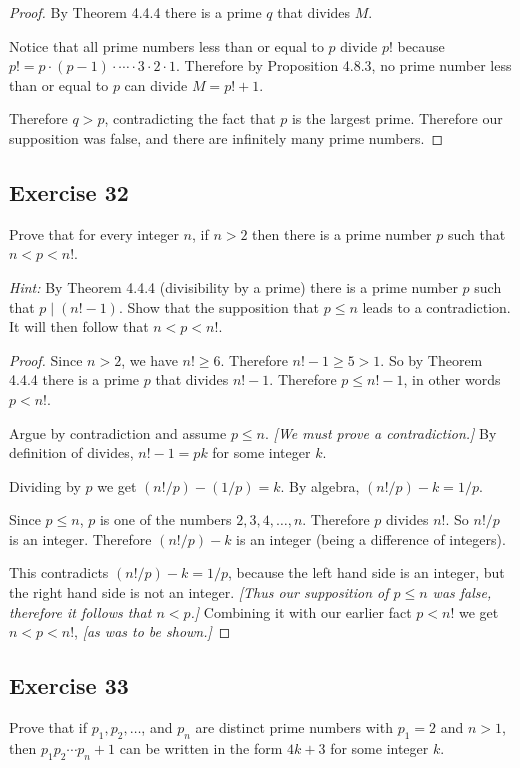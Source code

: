 \documentclass[14pt]{extarticle}
\begin{document}
\begin{proof}
By Theorem 4.4.4 there is a prime $q$ that divides $M$. 

Notice that all prime numbers less than or equal to $p$ divide $p!$ because $p! = p \cdot (p-1) \cdot \cdots \cdot 3 \cdot 2 \cdot 1$. Therefore by Proposition 4.8.3, no prime number less than or equal to $p$ can divide $M = p!+1$.

Therefore $q > p$, contradicting the fact that $p$ is the largest prime. Therefore our supposition was false, and there are infinitely many prime numbers.
\end{proof}

\subsection{Exercise 32}
Prove that for every integer $n$, if $n > 2$ then there is a prime number $p$ such that $n < p < n!$.

{\it Hint:} By Theorem 4.4.4 (divisibility by a prime) there is a prime number $p$ such that $p \mid (n! - 1)$. Show that the supposition that $p \leq n$ leads to a contradiction. It will then follow that $n < p < n!$.

\begin{proof}
Since $n > 2$, we have $n! \geq 6$. Therefore $n! - 1 \geq 5 > 1$. So by Theorem 4.4.4 there is a prime $p$ that divides $n!-1$. Therefore $p \leq n!-1$, in other words $p < n!$.

Argue by contradiction and assume $p \leq n$. {\it [We must prove a contradiction.]} By definition of divides, $n!-1 = pk$ for some integer $k$. 

Dividing by $p$ we get $(n!/p) - (1/p) = k$. By algebra, $(n!/p) - k = 1/p$.

Since $p \leq n$, $p$ is one of the numbers $2, 3, 4, \ldots, n$. Therefore $p$ divides $n!$. So $n! / p$ is an integer. Therefore $(n!/p) - k$ is an integer (being a difference of integers). 

This contradicts $(n!/p) - k = 1/p$, because the left hand side is an integer, but the right hand side is not an integer. {\it [Thus our supposition of $p \leq n$ was false, therefore it follows that $n < p$.]} Combining it with our earlier fact $p < n!$ we get $n < p < n!$, {\it [as was to be shown.]}
\end{proof}

\subsection{Exercise 33}
Prove that if $p_1, p_2, \ldots$, and $p_n$ are distinct prime numbers with $p_1 = 2$ and $n > 1$, then $p_1 p_2 \cdots p_n + 1$ can be written in the form $4k + 3$ for some integer $k$.
\end{document}
